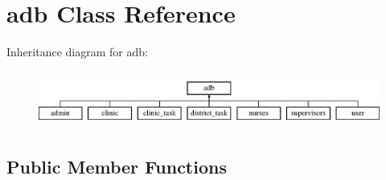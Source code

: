 \hypertarget{classadb}{}\section{adb Class Reference}
\label{classadb}
Inheritance diagram for adb\+:\begin{figure}[H]
\begin{center}
\leavevmode
\includegraphics[height=1.860465cm]{classadb}
\end{center}
\end{figure}
\subsection*{Public Member Functions}
